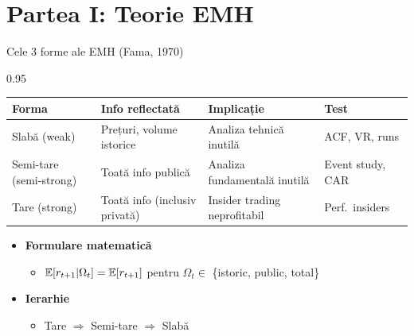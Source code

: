 \documentclass[9pt, aspectratio=169, t]{beamer}
\begin{document}
\section{Partea I: Teorie EMH}

\begin{frame}[shrink=15]{Cele 3 forme ale EMH (Fama, 1970)}
\begin{cminipage}{0.95\textwidth}
\small
\renewcommand{\arraystretch}{1.2}
\begin{center}
\begin{tabular}{llll}
\toprule
\textbf{Forma} & \textbf{Info reflectată} & \textbf{Implicație} & \textbf{Test} \\
\midrule
Slabă (weak) & Prețuri, volume istorice & Analiza tehnică inutilă & ACF, VR, runs \\
Semi-tare (semi-strong) & Toată info publică & Analiza fundamentală inutilă & Event study, CAR \\
Tare (strong) & Toată info (inclusiv privată) & Insider trading neprofitabil & Perf.\ insiders \\
\bottomrule
\end{tabular}
\end{center}

\vspace{0.2cm}
\begin{itemize}\setlength{\itemsep}{0pt}
    \item \textbf{Formulare matematică}
    \begin{itemize}\setlength{\itemsep}{0pt}
        \item $\mathbb{E}[r_{t+1} | \Omega_t] = \mathbb{E}[r_{t+1}]$ pentru $\Omega_t \in$ \{istoric, public, total\}
    \end{itemize}
    \item \textbf{Ierarhie}
    \begin{itemize}\setlength{\itemsep}{0pt}
        \item Tare $\Rightarrow$ Semi-tare $\Rightarrow$ Slabă
    \end{itemize}
\end{itemize}
\end{cminipage}
\end{frame}
\end{document}
